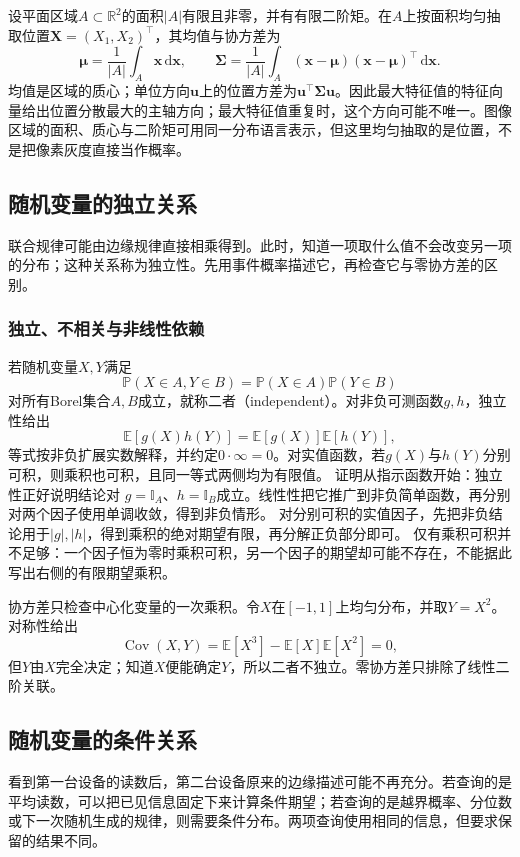 \begin{example}[区域分布的质心与主轴]
\label{ex:probability-region-moments}
设平面区域\(A\subset\mathbb R^2\)的面积\(|A|\)有限且非零，并有有限二阶矩。在\(A\)上按面积均匀抽取位置\(\bm X=(X_1,X_2)^\top\)，其均值与协方差为
\[
 \bm\mu=\frac1{|A|}\int_A\bm x\,\mathrm d\bm x,
 \qquad
 \bm\Sigma=\frac1{|A|}\int_A(\bm x-\bm\mu)(\bm x-\bm\mu)^\top\,\mathrm d\bm x.
\]
均值是区域的质心；单位方向\(\bm u\)上的位置方差为\(\bm u^\top\bm\Sigma\bm u\)。因此最大特征值的特征向量给出位置分散最大的主轴方向；最大特征值重复时，这个方向可能不唯一。图像区域的面积、质心与二阶矩可用同一分布语言表示，但这里均匀抽取的是位置，不是把像素灰度直接当作概率。
\end{example}

\subsection{随机变量的独立关系}
\label{sec:probability-moments-independence}

联合规律可能由边缘规律直接相乘得到。此时，知道一项取什么值不会改变另一项的分布；这种关系称为独立性。先用事件概率描述它，再检查它与零协方差的区别。

\subsubsection{独立、不相关与非线性依赖}
若随机变量\(X,Y\)满足
\[ \mathbb{P}(X\in A,Y\in B)
  =\mathbb{P}(X\in A)\mathbb{P}(Y\in B) \]
对所有Borel集合\(A,B\)成立，就称二者（independent）。对非负可测函数\(g,h\)，独立性给出
\[
 \mathbb{E}[g(X)h(Y)]=\mathbb{E}[g(X)]\mathbb{E}[h(Y)],
\]
等式按非负扩展实数解释，并约定\(0\cdot\infty=0\)。对实值函数，若\(g(X)\)与\(h(Y)\)分别可积，则乘积也可积，且同一等式两侧均为有限值。
证明从指示函数开始：独立性正好说明结论对
\(g=\mathbb{I}_A\)、\(h=\mathbb{I}_B\)成立。线性性把它推广到非负简单函数，再分别对两个因子使用单调收敛，得到非负情形。
对分别可积的实值因子，先把非负结论用于\(|g|,|h|\)，得到乘积的绝对期望有限，再分解正负部分即可。
仅有乘积可积并不足够：一个因子恒为零时乘积可积，另一个因子的期望却可能不存在，不能据此写出右侧的有限期望乘积。

协方差只检查中心化变量的一次乘积。令\(X\)在\([-1,1]\)上均匀分布，并取\(Y=X^2\)。对称性给出
\[ \operatorname{Cov}(X,Y)
  =\mathbb{E}[X^3]-\mathbb{E}[X]\mathbb{E}[X^2]=0, \]
但\(Y\)由\(X\)完全决定；知道\(X\)便能确定\(Y\)，所以二者不独立。零协方差只排除了线性二阶关联。

\subsection{随机变量的条件关系}
看到第一台设备的读数后，第二台设备原来的边缘描述可能不再充分。若查询的是平均读数，可以把已见信息固定下来计算条件期望；若查询的是越界概率、分位数或下一次随机生成的规律，则需要条件分布。两项查询使用相同的信息，但要求保留的结果不同。

